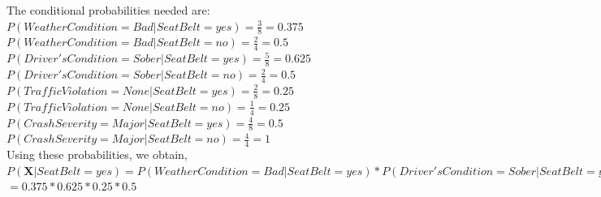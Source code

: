 \documentclass[10pt]{article}
\begin{document}
\vspace{0.5em}
The conditional probabilities needed are: \\
\vspace{0.5em}
\hspace{2em} $P( Weather Condition = Bad | Seat Belt = yes) = \frac{3}{8} = 0.375$\\
\vspace{0.5em}
\hspace{2em} $P( Weather Condition = Bad | Seat Belt = no) = \frac{2}{4} = 0.5$\\
\vspace{0.5em}
\hspace{2em} $P( Driver's Condition = Sober | Seat Belt = yes) = \frac{5}{8} = 0.625$\\
\vspace{0.5em}
\hspace{2em} $P( Driver's Condition = Sober | Seat Belt = no) = \frac{2}{4} = 0.5$\\
\vspace{0.5em}
\hspace{2em} $P( Traffic Violation = None | Seat Belt = yes) = \frac{2}{8} = 0.25$\\
\vspace{0.5em}
\hspace{2em} $P( Traffic Violation = None | Seat Belt = no) = \frac{1}{4} = 0.25$\\
\vspace{0.5em}
\hspace{2em} $P( Crash Severity = Major | Seat Belt = yes) = \frac{4}{8} = 0.5$\\
\vspace{0.5em}
\hspace{2em} $P( Crash Severity = Major | Seat Belt = no) = \frac{4}{4} = 1$\\
\vspace{1em}
Using these probabilities, we obtain,\\
\vspace{0.5em}
\hspace{2em} $P(\textbf{X} | Seat Belt = yes) = P( Weather Condition = Bad | Seat Belt = yes) * P( Driver's Condition = Sober | Seat Belt = yes) * P( Traffic Violation = None | Seat Belt = yes) * P( Crash Severity = Major | Seat Belt = yes)$\\
\vspace{0.5em}
\hspace{11.5em} $ = 0.375 * 0.625 * 0.25 * 0.5$\\
\vspace{0.5em}
\end{document}
